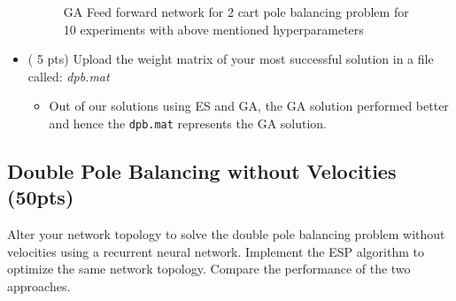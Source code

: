 \documentclass{article}
\begin{document}
\begin{itemize}
\begin{figure}[htpb]
            \caption{GA Feed forward network for 2 cart pole balancing problem for 10 experiments with above mentioned hyperparameters}
            \label{fig:}
        \end{figure}
	\item ( 5 pts) Upload the weight matrix of your most successful solution in a file called: \textit{dpb.mat}
	\begin{itemize}
\color{blue}
	\item Out of our solutions using ES and GA, the GA solution performed better and hence the \texttt{dpb.mat} represents the GA solution.
\color{black} 
	\end{itemize}
\end{itemize}

\newpage
\subsection{Double Pole Balancing without Velocities (50pts)}
Alter your network topology to solve the double pole balancing problem without velocities using a recurrent neural network. Implement the ESP algorithm to optimize the same network topology. Compare the performance of the two approaches.
\end{document}
